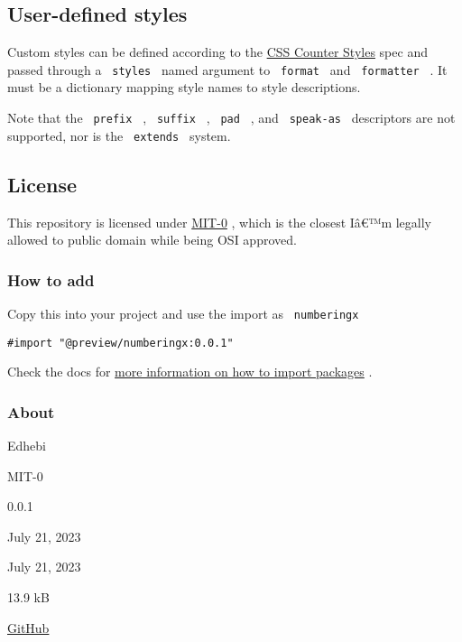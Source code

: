 \subsection{User-defined styles}\label{user-defined-styles}

Custom styles can be defined according to the
\href{https://www.w3.org/TR/css-counter-styles-3/}{CSS Counter Styles}
spec and passed through a \texttt{\ styles\ } named argument to
\texttt{\ format\ } and \texttt{\ formatter\ } . It must be a dictionary
mapping style names to style descriptions.

Note that the \texttt{\ prefix\ } , \texttt{\ suffix\ } ,
\texttt{\ pad\ } , and \texttt{\ speak-as\ } descriptors are not
supported, nor is the \texttt{\ extends\ } system.

\subsection{License}\label{license}

This repository is licensed under
\href{https://spdx.org/licenses/MIT-0.html}{MIT-0} , which is the
closest Iâ€™m legally allowed to public domain while being OSI approved.

\subsubsection{How to add}\label{how-to-add}

Copy this into your project and use the import as
\texttt{\ numberingx\ }

\begin{verbatim}
#import "@preview/numberingx:0.0.1"
\end{verbatim}



Check the docs for
\href{https://typst.app/docs/reference/scripting/\#packages}{more
information on how to import packages} .

\subsubsection{About}\label{about}

\begin{description}
\tightlist
\item[Author :]
Edhebi
\item[License:]
MIT-0
\item[Current version:]
0.0.1
\item[Last updated:]
July 21, 2023
\item[First released:]
July 21, 2023
\item[Archive size:]
13.9 kB
\href{https://packages.typst.org/preview/numberingx-0.0.1.tar.gz}{\pandocbounded{}}
\item[Repository:]
\href{https://github.com/edhebi/numberingx}{GitHub}
\end{description}

